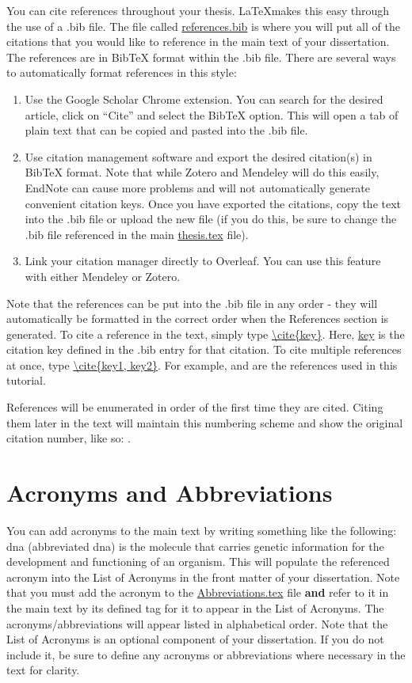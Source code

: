 You can cite references throughout your thesis. \LaTeX makes this easy through the use of a .bib file. The file called \url{references.bib} is where you will put all of the citations that you would like to reference in the main text of your dissertation. The references are in BibTeX format within the .bib file. There are several ways to automatically format references in this style:

\begin{enumerate}
    \item Use the Google Scholar Chrome extension. You can search for the desired article, click on ``Cite'' and select the BibTeX option. This will open a tab of plain text that can be copied and pasted into the .bib file.
    \item Use citation management software and export the desired citation(s) in BibTeX format. Note that while Zotero and Mendeley will do this easily, EndNote can cause more problems and will not automatically generate convenient citation keys. Once you have exported the citations, copy the text into the .bib file or upload the new file (if you do this, be sure to change the .bib file referenced in the main \url{thesis.tex} file).
    \item Link your citation manager directly to Overleaf. You can use this feature with either Mendeley or Zotero.
\end{enumerate}

Note that the references can be put into the .bib file in any order - they will automatically be formatted in the correct order when the References section is generated. To cite a reference in the text, simply type \url{\cite{key}}. Here, \url{key} is the citation key defined in the .bib entry for that citation. To cite multiple references at once, type \url{\cite{key1, key2}}. For example, \cite{anderson1995observation, schill2019water} and \cite{watson1953molecular} are the references used in this tutorial.

References will be enumerated in order of the first time they are cited. Citing them later in the text will maintain this numbering scheme and show the original citation number, like so: \cite{anderson1995observation}.

\section{Acronyms and Abbreviations}

You can add acronyms to the main text by writing something like the following: \acrlong{dna} (abbreviated \acrshort{dna}) is the molecule that carries genetic information for the development and functioning of an organism. This will populate the referenced acronym into the List of Acronyms in the front matter of your dissertation. Note that you must add the acronym to the \url{Abbreviations.tex} file \textbf{and} refer to it in the main text by its defined tag for it to appear in the List of Acronyms. The acronyms/abbreviations will appear listed in alphabetical order. Note that the List of Acronyms is an optional component of your dissertation. If you do not include it, be sure to define any acronyms or abbreviations where necessary in the text for clarity.

